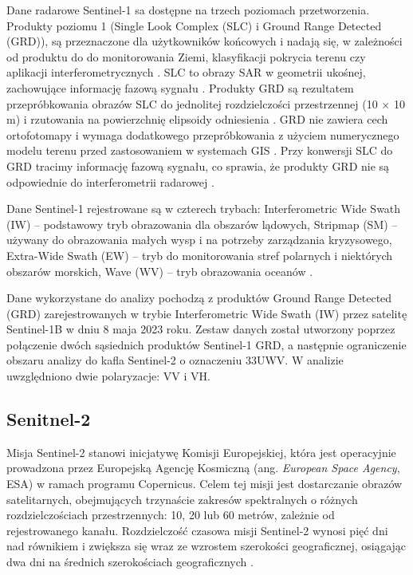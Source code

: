 \documentclass{amuthesis}
\begin{document}
Dane radarowe Sentinel-1 sa dostępne na trzech poziomach przetworzenia.
Produkty poziomu 1 (Single Look Complex (SLC) i Ground Range Detected
(GRD)), są przeznaczone dla użytkowników końcowych i nadają się, w
zależności od produktu do do monitorowania Ziemi, klasyfikacji pokrycia
terenu czy aplikacji interferometrycznych
\autocite{hejmanowska_2020_dane}. SLC to obrazy SAR w geometrii ukośnej,
zachowujące informację fazową sygnału \autocite{hejmanowska_2020_dane}.
Produkty GRD są rezultatem przepróbkowania obrazów SLC do jednolitej
rozdzielczości przestrzennej (10 × 10 m) i rzutowania na powierzchnię
elipsoidy odniesienia \autocite{hejmanowska_2020_dane}. GRD nie zawiera
cech ortofotomapy i wymaga dodatkowego przepróbkowania z użyciem
numerycznego modelu terenu przed zastosowaniem w systemach GIS
\autocite{hejmanowska_2020_dane}. Przy konwersji SLC do GRD tracimy
informację fazową sygnału, co sprawia, że produkty GRD nie są
odpowiednie do interferometrii radarowej \autocite{sentinel1_products}.

Dane Sentinel-1 rejestrowane są w czterech trybach: Interferometric Wide
Swath (IW) -- podstawowy tryb obrazowania dla obszarów lądowych,
Stripmap (SM) -- używany do obrazowania małych wysp i na potrzeby
zarządzania kryzysowego, Extra-Wide Swath (EW) -- tryb do monitorowania
stref polarnych i niektórych obszarów morskich, Wave (WV) -- tryb
obrazowania oceanów
\autocite{hejmanowska_2020_dane,sentinel1_instrument_payload,sentinel1_stripmap}.

Dane wykorzystane do analizy pochodzą z produktów Ground Range Detected
(GRD) zarejestrowanych w trybie Interferometric Wide Swath (IW) przez
satelitę Sentinel-1B w dniu 8 maja 2023 roku. Zestaw danych został
utworzony poprzez połączenie dwóch sąsiednich produktów Sentinel-1 GRD,
a następnie ograniczenie obszaru analizy do kafla Sentinel-2 o
oznaczeniu 33UWV. W analizie uwzględniono dwie polaryzacje: VV i VH.

\hypertarget{sec-sentinel2}{%
\subsection{Senitnel-2}\label{sec-sentinel2}}

Misja Sentinel-2 stanowi inicjatywę Komisji Europejskiej, która jest
operacyjnie prowadzona przez Europejską Agencję Kosmiczną (ang.
\emph{European Space Agency}, ESA) w ramach programu Copernicus. Celem
tej misji jest dostarczanie obrazów satelitarnych, obejmujących
trzynaście zakresów spektralnych o różnych rozdzielczościach
przestrzennych: 10, 20 lub 60 metrów, zależnie od rejestrowanego kanału.
Rozdzielczość czasowa misji Sentinel-2 wynosi pięć dni nad równikiem i
zwiększa się wraz ze wzrostem szerokości geograficznej, osiągając dwa
dni na średnich szerokościach geograficznych
\autocite{hejmanowska_2020_dane}.
\end{document}
